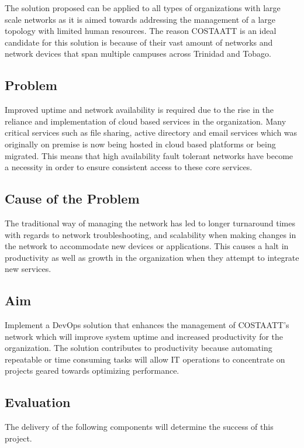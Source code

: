 \documentclass[12pt, letterpaper]{article}
\begin{document}
\medskip

The solution proposed can be applied to all types of organizations with large scale networks as it is aimed towards addressing the management of a large topology with limited human resources. The reason COSTAATT is an ideal candidate for this solution is because of their vast amount of networks and network devices that span multiple campuses across Trinidad and Tobago. 
	
	\subsection{Problem}
Improved uptime and network availability is required due to the rise in the reliance and implementation of cloud based services in the organization. Many critical services such as file sharing, active directory and email services which was originally on premise is now being hosted in cloud based platforms or being migrated. This means that high availability fault tolerant networks have become a necessity in order to ensure consistent access to these core services.

	\subsection{Cause of the Problem}
The traditional way of managing the network has led to longer turnaround times with regards to network troubleshooting, and scalability when making changes in the network to accommodate new devices or applications. This causes a halt in productivity as well as growth in the organization when they attempt to integrate new services. 
	
	
	\subsection{Aim}
Implement a DevOps solution that enhances the management of COSTAATT's network which will improve system uptime and increased productivity for the organization. The solution contributes to productivity because automating repeatable or time consuming tasks will allow IT operations to concentrate on projects geared towards optimizing performance.

\newpage
	\subsection{Evaluation}
The delivery of the following components will determine the success of this project.
\end{document}
